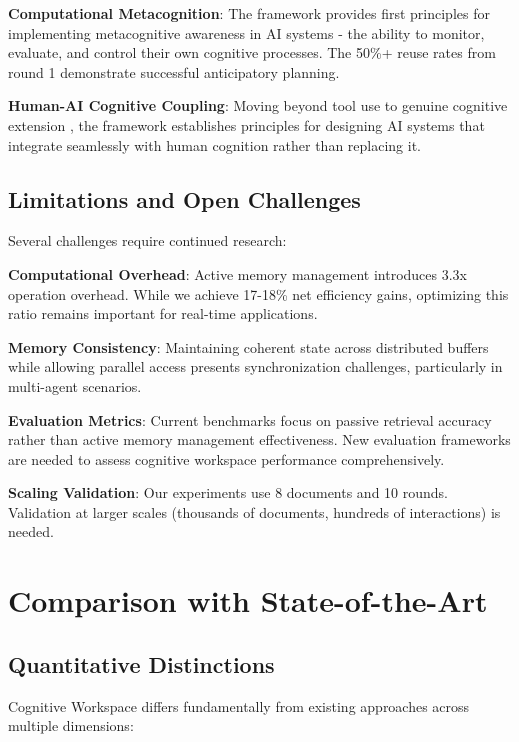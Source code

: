 \documentclass[10pt,twocolumn]{article}
\begin{document}
\textbf{Computational Metacognition}: The framework provides first principles for implementing metacognitive awareness in AI systems \cite{cox2005metacognition} - the ability to monitor, evaluate, and control their own cognitive processes. The 50\%+ reuse rates from round 1 demonstrate successful anticipatory planning.

\textbf{Human-AI Cognitive Coupling}: Moving beyond tool use to genuine cognitive extension \cite{clark2008supersizing}, the framework establishes principles for designing AI systems that integrate seamlessly with human cognition rather than replacing it.

\subsection{Limitations and Open Challenges}

Several challenges require continued research:

\textbf{Computational Overhead}: Active memory management introduces 3.3x operation overhead. While we achieve 17-18\% net efficiency gains, optimizing this ratio remains important for real-time applications.

\textbf{Memory Consistency}: Maintaining coherent state across distributed buffers while allowing parallel access presents synchronization challenges, particularly in multi-agent scenarios.

\textbf{Evaluation Metrics}: Current benchmarks focus on passive retrieval accuracy rather than active memory management effectiveness. New evaluation frameworks are needed to assess cognitive workspace performance comprehensively.

\textbf{Scaling Validation}: Our experiments use 8 documents and 10 rounds. Validation at larger scales (thousands of documents, hundreds of interactions) is needed.

\section{Comparison with State-of-the-Art}

\subsection{Quantitative Distinctions}

Cognitive Workspace differs fundamentally from existing approaches across multiple dimensions:
\end{document}
